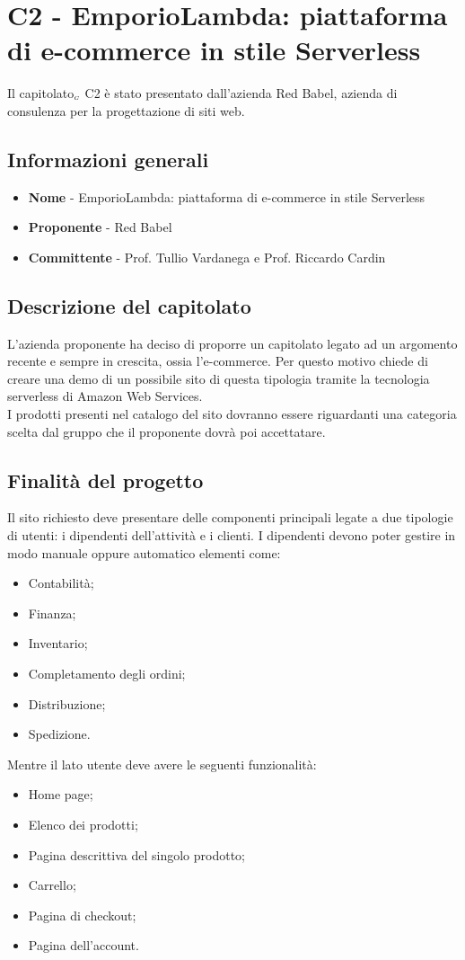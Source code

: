\chapter{C2 - EmporioLambda: piattaforma di e-commerce in stile Serverless} \label{CapitolatoC2}
Il capitolato$_{\scaleto{G}{3pt}}$ C2 è stato presentato dall'azienda Red Babel, azienda di consulenza per la progettazione di siti web.
\section{Informazioni generali} \label{C2InformazioniGenerali}
\begin{itemize}
	\item \textbf{Nome} - EmporioLambda: piattaforma di e-commerce in stile Serverless
	\item \textbf{Proponente} - Red Babel
	\item \textbf{Committente} - Prof. Tullio Vardanega e Prof. Riccardo Cardin
\end{itemize}
\section{Descrizione del capitolato} \label{C2DescrizioneDelCapitolato}
L'azienda proponente ha deciso di proporre un capitolato legato ad un argomento recente e sempre in crescita, ossia l'e-commerce. Per questo motivo chiede di creare una demo di un possibile sito di questa tipologia tramite la tecnologia serverless di Amazon Web Services. \\
I prodotti presenti nel catalogo del sito dovranno essere riguardanti una categoria scelta dal gruppo che il proponente dovrà poi accettatare.
\section{Finalità del progetto} \label{C2FinalitàDelProgetto}
Il sito richiesto deve presentare delle componenti principali legate a due tipologie di utenti: i dipendenti dell'attività e i clienti. I dipendenti devono poter gestire in modo manuale oppure automatico elementi come:
\begin{itemize}
	\item Contabilità;
	\item Finanza;
	\item Inventario;
	\item Completamento degli ordini;
	\item Distribuzione;
	\item Spedizione.
\end{itemize}
Mentre il lato utente deve avere le seguenti funzionalità:
\begin{itemize}
	\item Home page;
	\item Elenco dei prodotti;
	\item Pagina descrittiva del singolo prodotto;
	\item Carrello;
	\item Pagina di checkout;
	\item Pagina dell'account.
\end{itemize}
